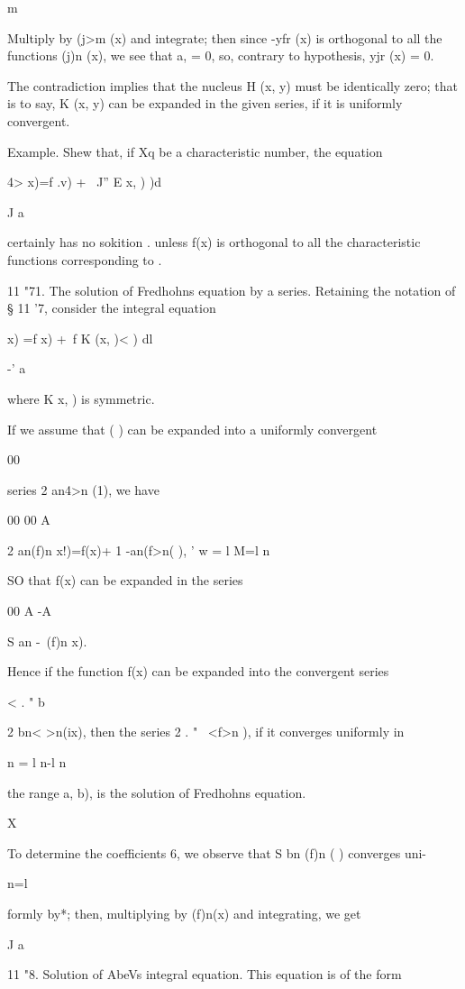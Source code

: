 {m

Multiply by (j>m (x) and integrate; then since -yfr (x) is orthogonal
to all the functions (j)n (x), we see that a, = 0, so, contrary to
hypothesis, yjr (x) = 0.

The contradiction implies that the nucleus H (x, y) must be
identically zero; that is to say, K (x, y) can be expanded in the
given series, if it is uniformly convergent.

Example. Shew that, if Xq be a characteristic number, the equation

4> x)=f .v) + \ J'' E x, ) )d

J a

certainly has no sokition . unless f(x) is orthogonal to all the
characteristic functions corresponding to .

11 "71. The solution of Fredhohns equation by a series. Retaining the
notation of § 11 '7, consider the integral equation

   x) =f x) +\ f K (x, )< ) dl

-' a

where K x, ) is symmetric.

If we assume that ( ) can be expanded into a uniformly convergent

00

series 2 an4>n (1), we have

00 00 A

2 an(f)n x!)=f(x)+ 1 -an(f>n( ), ' w = l M=l n

SO that f(x) can be expanded in the series

00 A -A

S an -\ (f)n x).

Hence if the function f(x) can be expanded into the convergent series

< . " b \

2 bn< >n(ix), then the series 2 . " \ <f>n ), if it converges
uniformly in

n = l n-l n

the range a, b), is the solution of Fredhohns equation.

%
%

X

To determine the coefficients 6, we observe that S bn (f)n ( )
converges uni-

n=l

formly by*; then, multiplying by (f)n(x) and integrating, we
get

J a

11 "8. Solution of AbeVs integral equation. This equation is of the
form

}
